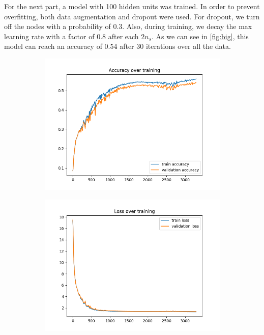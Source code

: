 \documentclass[a4paper]{article}
\begin{document}
For the next part, a model with 100 hidden units was trained. In order to prevent overfitting, both data augmentation and dropout were used. For dropout, we turn off the nodes with a probability of 0.3. Also, during training, we decay the max learning rate with a factor of 0.8 after each $2 n_s$. As we can see in \autoref{fig:big}, this model can reach an accuracy of 0.54 after 30 iterations over all the data.


\begin{figure}[h]
	\centering
	\begin{subfigure}{0.3\textwidth}
		\centering
		\includegraphics[width=\linewidth]{images/100_node_model_acc.png}
		\caption{}
	\end{subfigure}
	\begin{subfigure}{0.3\textwidth}
		\centering
		\includegraphics[width=\linewidth]{images/100_node_model_loss.png}

\end{subfigure}
\end{figure}
\end{document}
